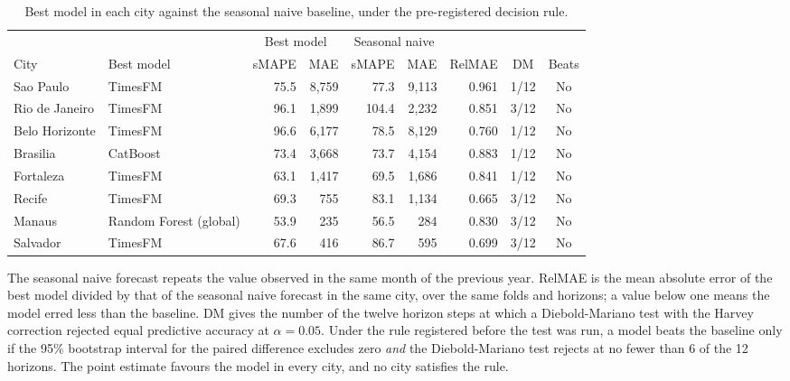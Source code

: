 \begin{table}[htbp]
\centering
\footnotesize
\setlength{\tabcolsep}{4pt}
\caption{Best model in each city against the seasonal naive baseline, under the
pre-registered decision rule.}
\label{tab:baseline}
\begin{tabular}{llrrrrrcc}
\toprule
 & & \multicolumn{2}{c}{Best model} & \multicolumn{2}{c}{Seasonal naive} & & & \\
\cmidrule(lr){3-4} \cmidrule(lr){5-6}
City & Best model & sMAPE & MAE & sMAPE & MAE & RelMAE & DM & Beats \\
\midrule
Sao Paulo & TimesFM & 75.5 & 8,759 & 77.3 & 9,113 & 0.961 & 1/12 & No \\
Rio de Janeiro & TimesFM & 96.1 & 1,899 & 104.4 & 2,232 & 0.851 & 3/12 & No \\
Belo Horizonte & TimesFM & 96.6 & 6,177 & 78.5 & 8,129 & 0.760 & 1/12 & No \\
Brasilia & CatBoost & 73.4 & 3,668 & 73.7 & 4,154 & 0.883 & 1/12 & No \\
Fortaleza & TimesFM & 63.1 & 1,417 & 69.5 & 1,686 & 0.841 & 1/12 & No \\
Recife & TimesFM & 69.3 & 755 & 83.1 & 1,134 & 0.665 & 3/12 & No \\
Manaus & Random Forest (global) & 53.9 & 235 & 56.5 & 284 & 0.830 & 3/12 & No \\
Salvador & TimesFM & 67.6 & 416 & 86.7 & 595 & 0.699 & 3/12 & No \\
\bottomrule
\end{tabular}

\vspace{0.5em}
\begin{minipage}{\textwidth}
\footnotesize
The seasonal naive forecast repeats the value observed in the same month of the previous
year. RelMAE is the mean absolute error of the best model divided by that of the seasonal
naive forecast in the same city, over the same folds and horizons; a value below one means
the model erred less than the baseline. DM gives the number of the twelve horizon steps at
which a Diebold-Mariano test with the Harvey correction rejected equal predictive accuracy
at $\alpha = 0.05$. Under the rule registered before the test was run, a model
beats the baseline only if the 95\% bootstrap interval for the paired difference excludes
zero {\itshape and} the Diebold-Mariano test rejects at no fewer than
6 of the 12 horizons. The point estimate favours the
model in every city, and no city satisfies the rule.
\end{minipage}
\end{table}
